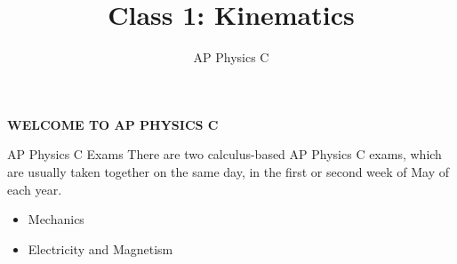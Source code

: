 \documentclass[12pt,compress,aspectratio=169,dvipsnames]{beamer}
\title{Class 1: Kinematics}
\subtitle{AP Physics C}
\begin{document}
\begin{frame}
  \centering\Large
  \textbf{WELCOME TO AP PHYSICS C}
\end{frame}






\begin{frame}{AP Physics C Exams}
  There are two calculus-based AP Physics C exams, which are usually taken
  together on the same day, in the first or second week of May of each year.
  \begin{itemize}
  \item Mechanics
  \item Electricity and Magnetism
  \end{itemize}
\end{frame}



\begin{frame}
  \titlepage
\end{frame}
\end{document}
